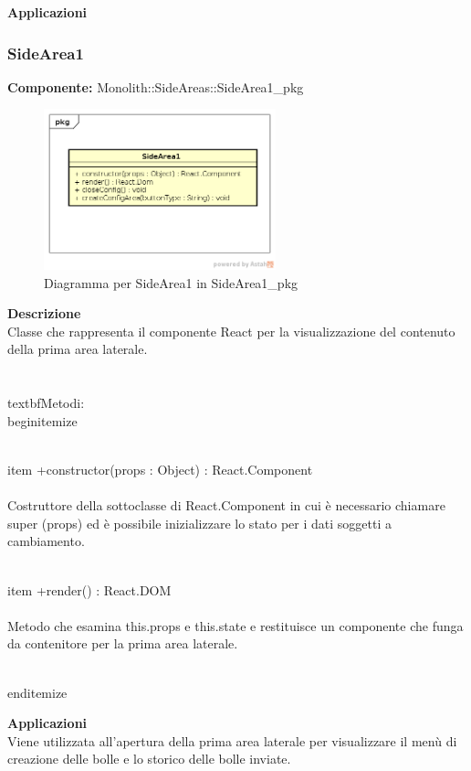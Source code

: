 \textbf{Applicazioni}\\
 


\clearpage

\subsubsection{SideArea1}
\textbf{Componente:}  Monolith::SideAreas::SideArea1\_pkg\\
   \FloatBarrier
   \begin{figure}[ht]
   \centering
   \includegraphics[width=0.6\textwidth]{img/single-SideArea1}
   \caption{{Diagramma per SideArea1 in SideArea1\_pkg}}
\end{figure}
\FloatBarrier
\textbf{Descrizione}\\
Classe che rappresenta il componente React per la visualizzazione del contenuto della prima area laterale. \\\\ 
\\textbf{Metodi:}
\\begin{itemize}

\\item +constructor(props : Object) : React.Component 
\\\\
Costruttore della sottoclasse di React.Component in cui è necessario chiamare super (props) ed è possibile inizializzare lo stato per i dati soggetti a cambiamento.

\\item +render() : React.DOM 
\\\\
Metodo che esamina this.props e this.state e restituisce un componente che funga da contenitore per la prima area laterale.

\\end{itemize} 


\textbf{Applicazioni}\\
Viene utilizzata all'apertura della prima area laterale per visualizzare il menù di creazione delle bolle e lo storico delle bolle inviate. 


